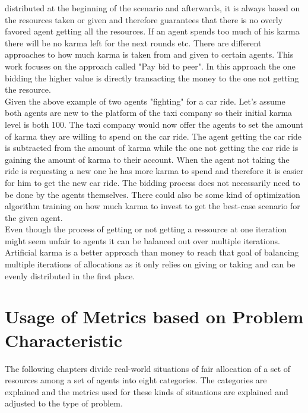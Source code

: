 \documentclass[german, a4paper, 11pt, oneside]{scrbook}
\begin{document}
distributed at the beginning of the scenario and afterwards, it is always based on the resources taken or given and therefore guarantees that there is no overly favored agent getting all the resources. If an agent spends too much of his karma there will be no karma left for the next rounds etc.  \cite{Elokda.2023}
There are different approaches to how much karma is taken from and given to certain agents. This work focuses on the approach called "Pay bid to peer". In this approach the one bidding the higher value is directly transacting the money to the one not getting the resource. \cite{Elokda.2023} \\Given the above example of two agents "fighting" for a car ride. Let's assume both agents are new to the platform of the taxi company so their initial karma level is both 100. The taxi company would now offer the agents to set the amount of karma they are willing to spend on the car ride. The agent getting the car ride is subtracted from the amount of karma while the one not getting the car ride is gaining the amount of karma to their account. When the agent not taking the ride is requesting a new one he has more karma to spend and therefore it is easier for him to get the new car ride. The bidding process does not necessarily need to be done by the agents themselves. There could also be some kind of optimization algorithm training on how much karma to invest to get the best-case scenario for the given agent.
\\Even though the process of getting or not getting a ressource at one iteration might seem unfair to agents it can be balanced out over multiple iterations. Artificial karma is a better approach than money to reach that goal of balancing multiple iterations of allocations as it only relies on giving or taking and can be evenly distributed in the first place. \cite{Elokda.2023}

\chapter{Usage of Metrics based on Problem Characteristic}
The following chapters divide real-world situations of fair allocation of a set of resources among a set of agents into eight categories. The categories are explained and the metrics used for these kinds of situations are explained and adjusted to the type of problem.
\end{document}
